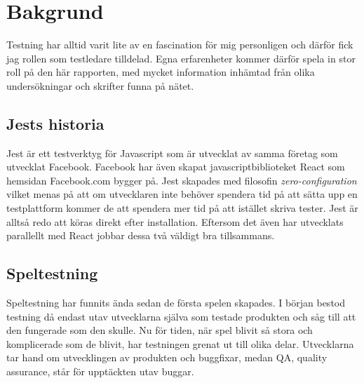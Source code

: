 \section{Bakgrund}
\label{sec:david-background}
Testning har alltid varit lite av en fascination för mig personligen och därför fick jag rollen som testledare tilldelad. Egna erfarenheter kommer därför spela in stor roll på den här rapporten, med mycket information inhämtad från olika undersökningar och skrifter funna på nätet.

\subsection{Jests historia}
Jest är ett testverktyg för Javascript som är utvecklat av samma företag som utvecklat Facebook. Facebook  har även skapat javascriptbiblioteket React\cite{bib-react} som hemsidan Facebook.com bygger på. Jest skapades med filosofin \textit{zero-configuration} vilket menas på att om utvecklaren inte behöver spendera tid på att sätta upp en testplattform kommer de att spendera mer tid på att istället skriva tester. Jest är alltså redo att köras direkt efter installation. Eftersom det även har utvecklats parallellt med React jobbar dessa två väldigt bra tillsammans.

\subsection{Speltestning}
Speltestning har funnits ända sedan de första spelen skapades. I början bestod testning då endast utav utvecklarna själva som testade produkten och såg till att den fungerade som den skulle. Nu för tiden, när spel blivit så stora och komplicerade som de blivit, har testningen grenat ut till olika delar. Utvecklarna tar hand om utvecklingen av produkten och buggfixar, medan QA, quality assurance, står för upptäckten utav buggar\cite{bib-quality-assured}. 